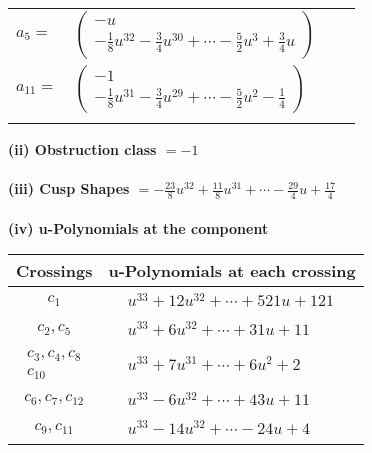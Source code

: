 \documentclass[1p]{elsarticle_modified}
\theoremstyle{definition}
\begin{document}
\begin{tabular}{m{7pt} m{180pt} m{7pt} m{180pt} }
\flushright $a_{5}=$&$\begin{pmatrix}- u\\-\frac{1}{8} u^{32}-\frac{3}{4} u^{30}+\cdots-\frac{5}{2} u^3+\frac{3}{4} u\end{pmatrix}$ \\
\flushright $a_{11}=$&$\begin{pmatrix}-1\\-\frac{1}{8} u^{31}-\frac{3}{4} u^{29}+\cdots-\frac{5}{2} u^2-\frac{1}{4}\end{pmatrix}$\\&\end{tabular}
\flushleft \textbf{(ii) Obstruction class $= -1$}\\~\\
\flushleft \textbf{(iii) Cusp Shapes $= -\frac{23}{8} u^{32}+\frac{11}{8} u^{31}+\cdots-\frac{29}{4} u+\frac{17}{4}$}\\~\\
\newpage\renewcommand{\arraystretch}{1}
\flushleft \textbf{(iv) u-Polynomials at the component}\newline \\
\begin{tabular}{m{50pt}|m{274pt}}
Crossings & \hspace{64pt}u-Polynomials at each crossing \\
\hline $$\begin{aligned}c_{1}\end{aligned}$$&$\begin{aligned}
&u^{33}+12 u^{32}+\cdots+521 u+121
\end{aligned}$\\
\hline $$\begin{aligned}c_{2},c_{5}\end{aligned}$$&$\begin{aligned}
&u^{33}+6 u^{32}+\cdots+31 u+11
\end{aligned}$\\
\hline $$\begin{aligned}c_{3},c_{4},c_{8}\\c_{10}\end{aligned}$$&$\begin{aligned}
&u^{33}+7 u^{31}+\cdots+6 u^2+2
\end{aligned}$\\
\hline $$\begin{aligned}c_{6},c_{7},c_{12}\end{aligned}$$&$\begin{aligned}
&u^{33}-6 u^{32}+\cdots+43 u+11
\end{aligned}$\\
\hline $$\begin{aligned}c_{9},c_{11}\end{aligned}$$&$\begin{aligned}
&u^{33}-14 u^{32}+\cdots-24 u+4
\end{aligned}$\\
\hline
\end{tabular}\\~\\
\end{document}
